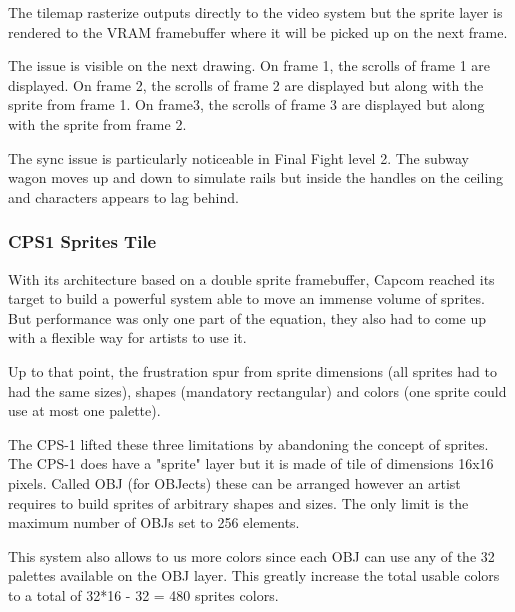 The tilemap rasterize outputs directly to the video system but the sprite layer is rendered to the VRAM framebuffer where it will be picked up on the next frame.
 


The issue is visible on the next drawing. On frame 1, the scrolls of frame 1 are displayed. On frame 2, the scrolls of frame 2 are displayed but along with the sprite from frame 1. On frame3, the scrolls of frame 3 are displayed but along with the sprite from frame 2. 


\begin{trivia}
The sync issue is particularly noticeable in Final Fight level 2. The subway wagon moves up and down to simulate rails but inside the handles on the ceiling and characters appears to lag behind.
\end{trivia}

\subsubsection{CPS1 Sprites Tile}
With its architecture based on a double sprite framebuffer, Capcom reached its target to build a powerful system able to move an immense volume of sprites. But performance was only one part of the equation, they also had to come up with a flexible way for artists to use it.

Up to that point, the frustration spur from sprite dimensions (all sprites had to had the same sizes), shapes (mandatory rectangular) and colors (one sprite could use at most one palette). 

The CPS-1 lifted these three limitations by abandoning the concept of sprites. The CPS-1 does have a "sprite" layer but it is made of tile of dimensions 16x16 pixels. Called OBJ (for OBJects) these can be arranged however an artist requires to build sprites of arbitrary shapes and sizes. The only limit is the maximum number of OBJs set to 256 elements. 

This system also allows to us more colors since each OBJ can use any of the 32 palettes available on the OBJ layer. This greatly increase the total usable colors to a total of 32*16 - 32 = 480 sprites colors. 




\begin{minipage}[t]{0.49\linewidth}
\end{minipage}%
\hfill%
\begin{minipage}[t]{0.49\linewidth}
\end{minipage}


